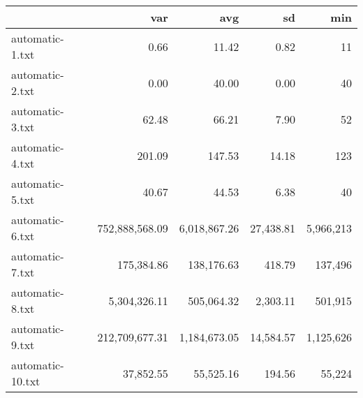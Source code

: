 \begin{tabular}{lrrrr}
  \toprule  & var & avg & sd & min \\ 
  \midrule automatic-1.txt & 0.66 & 11.42 & 0.82 & 11 \\ 
  automatic-2.txt & 0.00 & 40.00 & 0.00 & 40 \\ 
  automatic-3.txt & 62.48 & 66.21 & 7.90 & 52 \\ 
  automatic-4.txt & 201.09 & 147.53 & 14.18 & 123 \\ 
  automatic-5.txt & 40.67 & 44.53 & 6.38 & 40 \\ 
  automatic-6.txt & 752,888,568.09 & 6,018,867.26 & 27,438.81 & 5,966,213 \\ 
  automatic-7.txt & 175,384.86 & 138,176.63 & 418.79 & 137,496 \\ 
  automatic-8.txt & 5,304,326.11 & 505,064.32 & 2,303.11 & 501,915 \\ 
  automatic-9.txt & 212,709,677.31 & 1,184,673.05 & 14,584.57 & 1,125,626 \\ 
  automatic-10.txt & 37,852.55 & 55,525.16 & 194.56 & 55,224 \\ 
   \bottomrule \end{tabular}
